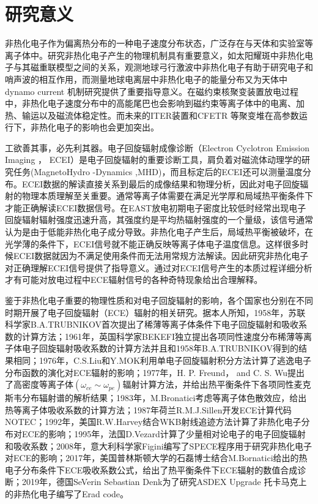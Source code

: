 \section{研究意义}
非热化电子作为偏离热分布的一种电子速度分布状态，广泛存在与天体和实验室等离子体中。研究非热化电子产生的物理机制具有重要意义，如太阳耀斑中非热化电子与其磁重联模型之间的关系\cite{RN980}，观测地球弓行激波中非热化电子有助于研究电子和哨声波的相互作用\cite{RN981}，而测量地球电离层中非热化电子的能量分布又为天体中dynamo current 机制研究提供了重要指导意义\cite{RN981}。在磁约束核聚变装置放电过程中，非热化电子速度分布中的高能尾巴也会影响到磁约束等离子体中的电离、加热、输运以及磁流体稳定性。而未来的ITER装置和CFETR 等聚变堆在高参数运行下，非热化电子的影响也会更加突出\cite{RN1689}。

工欲善其事，必先利其器。电子回旋辐射成像诊断（Electron Cyclotron Emission Imaging ， ECEI）是电子回旋辐射的重要诊断工具\cite{RN1020,RN1753,RN2124,RN1044,RN4}，肩负着对磁流体动理学的研究任务(MagnetoHydro -Dynamics ,MHD)，而且标定后的ECEI还可以测量温度分布\cite{RN1381}。ECEI数据的解读直接关系到最后的成像结果和物理分析，因此对电子回旋辐射的物理本质理解至关重要。通常等离子体需要在满足光学厚和局域热平衡条件下才能正确解读ECEI数据信号。在EAST放电初期电子密度比较低时经常出现电子回旋辐射辐射强度迅速升高，其强度约是平均热辐射强度的一个量级，该信号通常认为是由于低能非热化电子成分导致\cite{RN757}。非热化电子产生后，局域热平衡被破坏，在光学薄的条件下，ECEI信号就不能正确反映等离子体电子温度信息。这样很多时候ECEI数据就因为不满足使用条件而无法用常规方法解读。因此研究非热化电子对正确理解ECEI信号提供了指导意义。通过对ECEI信号产生的本质过程详细分析才有可能对放电过程中ECE辐射信号的各种奇特现象给出合理解释。
\par 鉴于非热化电子重要的物理性质和对电子回旋辐射的影响，各个国家也分别在不同时期开展了电子回旋辐射（ECE）辐射的相关研究。据本人所知，1958年，苏联科学家B.A.TRUBNIKOV首次提出了稀薄等离子体条件下电子回旋辐射和吸收系数的计算方法\cite{RN1003,RN1002}；1961年，英国科学家BEKEFI独立提出各项同性速度分布稀薄等离子体电子回旋辐射吸收系数的计算方法\cite{RN1714}并且和1958年B.A.TRUBNIKOV得到的结果相同\cite{RN1003}；1976年，C.S.Liu和Y.MOK利用单电子回旋辐射积分方法计算了逃逸电子分布函数的演化对ECE辐射的影响\cite{RN1006}；1977年，H. P. Freund， and C. S. Wu提出了高密度等离子体$(ω_{ce}\sim ω_{pe})$辐射计算方法，并给出热平衡条件下各项同性麦克斯韦分布辐射谱的解析结果\cite{RN1007}；1983年，M.Bronatici考虑等离子体色散效应，给出热等离子体吸收系数的计算方法\cite{RN1717}；1987年荷兰R.M.J.Sillen开发ECE计算代码NOTEC\cite{RN1009}；1992年，美国R.W.Harvey结合WKB射线追迹方法计算了非热化电子分布对ECE的影响\cite{RN1010}；1995年，法国D.Vezard计算了少量相对论电子的电子回旋辐射和吸收系数\cite{RN2031}；2008年，意大利科学家Figini编写了SPECE程序用于研究非热化电子对ECE的影响\cite{RN1013}；2017年，美国普林斯顿大学的石磊博士结合M.Bornatici给出的热电子分布条件下ECE吸收系数公式，给出了热平衡条件下ECE辐射的数值合成诊断\cite{RN1014}；2019年，德国SeVerin Sebastian Denk为了研究ASDEX Upgrade 托卡马克上的非热化电子编写了Erad code\cite{RN1014}。
